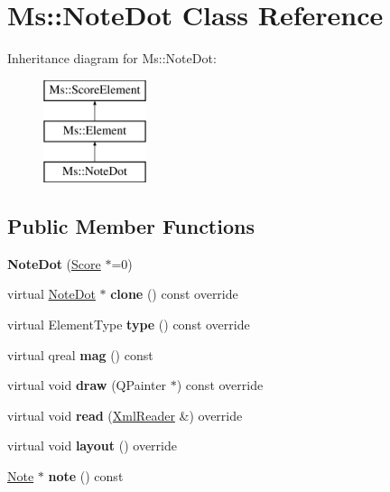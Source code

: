 \hypertarget{class_ms_1_1_note_dot}{}\section{Ms\+:\+:Note\+Dot Class Reference}
\label{class_ms_1_1_note_dot}
Inheritance diagram for Ms\+:\+:Note\+Dot\+:\begin{figure}[H]
\begin{center}
\leavevmode
\includegraphics[height=3.000000cm]{class_ms_1_1_note_dot}
\end{center}
\end{figure}
\subsection*{Public Member Functions}
\begin{DoxyCompactItemize}
\item 
\mbox{\label{class_ms_1_1_note_dot_a1b311ff4685f5a042d9f1806aac3f90e}} 
{\bfseries Note\+Dot} (\hyperlink{class_ms_1_1_score}{Score} $\ast$=0)
\item 
\mbox{\label{class_ms_1_1_note_dot_ab36f0f9249f5cc9800e236740e571eb3}} 
virtual \hyperlink{class_ms_1_1_note_dot}{Note\+Dot} $\ast$ {\bfseries clone} () const override
\item 
\mbox{\label{class_ms_1_1_note_dot_a06f824965fb86889d273bfc634ad5d90}} 
virtual Element\+Type {\bfseries type} () const override
\item 
\mbox{\label{class_ms_1_1_note_dot_a41eff5b730afcf9d79c47056b3799858}} 
virtual qreal {\bfseries mag} () const
\item 
\mbox{\label{class_ms_1_1_note_dot_a6b6fde78d71a10aa0ec4efe073ee7a53}} 
virtual void {\bfseries draw} (Q\+Painter $\ast$) const override
\item 
\mbox{\label{class_ms_1_1_note_dot_a306d73f079eac58f0523d2b100fd775d}} 
virtual void {\bfseries read} (\hyperlink{class_ms_1_1_xml_reader}{Xml\+Reader} \&) override
\item 
\mbox{\label{class_ms_1_1_note_dot_a299f0e40a9c55189fab6ae64774545c8}} 
virtual void {\bfseries layout} () override
\item 
\mbox{\label{class_ms_1_1_note_dot_a0ba418fdb5d637f3aa147be87e90de94}} 
\hyperlink{class_ms_1_1_note}{Note} $\ast$ {\bfseries note} () const
\end{DoxyCompactItemize}
